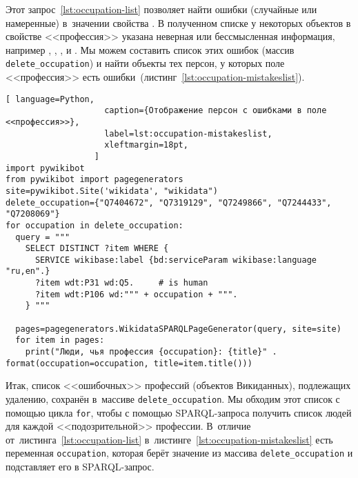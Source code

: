 Этот запрос~\ref{lst:occupation-list} позволяет найти ошибки 
(случайные или намеренные) в~значении свойства . 
В полученном списке у некоторых объектов в свойстве <<профессия>> 
указана неверная или бессмысленная информация, 
например 
, 
, 
, 
 и 
. 
Мы можем составить список этих ошибок (массив \lstinline|delete_occupation|)
и найти объекты тех персон, 
у которых поле <<профессия>> есть ошибки~(листинг~\ref{lst:occupation-mistakeslist}).




\newpage
\begin{lstlisting}[ language=Python,
                    caption={Отображение персон с ошибками в поле <<профессия>>},
                    label=lst:occupation-mistakeslist,
                    xleftmargin=18pt, 
                  ]
import pywikibot
from pywikibot import pagegenerators
site=pywikibot.Site('wikidata', "wikidata")
delete_occupation={"Q7404672", "Q7319129", "Q7249866", "Q7244433", 
"Q7208069"}
for occupation in delete_occupation:
  query = """
    SELECT DISTINCT ?item WHERE {
      SERVICE wikibase:label {bd:serviceParam wikibase:language "ru,en".}
      ?item wdt:P31 wd:Q5.     # is human
      ?item wdt:P106 wd:""" + occupation + """.
    } """

  pages=pagegenerators.WikidataSPARQLPageGenerator(query, site=site)
  for item in pages:
    print("Люди, чья профессия {occupation}: {title}" . format(occupation=occupation, title=item.title()))
\end{lstlisting} 

Итак, список <<ошибочных>> профессий (объектов Викиданных), подлежащих удалению, 
сохранён в~массиве \lstinline|delete_occupation|. 
Мы обходим этот список с помощью цикла \lstinline|for|, 
чтобы с помощью SPARQL-запроса получить список людей для каждой <<подозрительной>> профессии. 
В~отличие от~листинга~\ref{lst:occupation-list} 
в~листинге~\ref{lst:occupation-mistakeslist} есть переменная \lstinline|occupation|, 
которая берёт значение из массива \lstinline|delete_occupation| и подставляет его в SPARQL-запрос.

